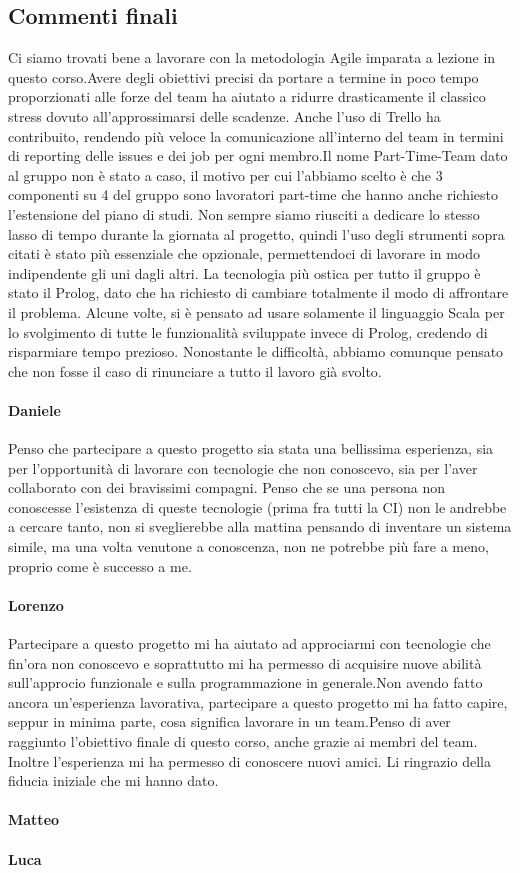 \subsection{Commenti finali}
Ci siamo trovati bene a lavorare con la metodologia Agile imparata a lezione in questo corso.Avere degli obiettivi precisi da portare a termine in poco tempo proporzionati alle forze del team ha aiutato a ridurre drasticamente il classico stress dovuto all’approssimarsi delle scadenze. \newline \newline Anche l’uso di Trello ha contribuito, rendendo più veloce la comunicazione all’interno del team in termini di reporting delle issues e dei job per ogni membro.\newline \newline Il nome Part-Time-Team dato al gruppo non è stato a caso, il motivo per cui l’abbiamo scelto è che 3 componenti su 4 del gruppo sono lavoratori part-time che hanno anche richiesto l’estensione del piano di studi. Non sempre siamo riusciti a dedicare lo stesso lasso di tempo durante la giornata al progetto, quindi l’uso degli strumenti sopra citati è stato più essenziale che opzionale, permettendoci di lavorare in modo indipendente gli uni dagli altri. \newline \newline La tecnologia più ostica per tutto il gruppo è stato il Prolog, dato che ha richiesto di cambiare totalmente il modo di affrontare il problema. Alcune volte, si è pensato ad usare solamente il linguaggio Scala per lo svolgimento di tutte le funzionalità sviluppate invece di Prolog, credendo di risparmiare tempo prezioso. Nonostante le difficoltà, abbiamo comunque pensato che non fosse il caso di rinunciare a tutto il lavoro già svolto.
\paragraph{Daniele}
Penso che partecipare a questo progetto sia stata una bellissima esperienza, sia per l’opportunità di lavorare con tecnologie che non conoscevo, sia per l’aver collaborato con dei bravissimi compagni. Penso che se una persona non conoscesse l’esistenza di queste tecnologie (prima fra tutti la CI) non le andrebbe a cercare tanto, non si sveglierebbe alla mattina pensando di inventare un sistema simile, ma una volta venutone a conoscenza, non ne potrebbe più fare a meno, proprio come è successo a me.
\paragraph{Lorenzo}
Partecipare a questo progetto mi ha aiutato ad approciarmi con tecnologie che fin'ora non conoscevo e soprattutto mi ha permesso di acquisire nuove abilità sull'approcio funzionale e sulla programmazione in generale.Non avendo fatto ancora un'esperienza lavorativa, partecipare a questo progetto mi ha fatto capire, seppur in minima parte, cosa significa lavorare in un team.\newline Penso di aver raggiunto l'obiettivo finale di questo corso, anche grazie ai membri del team. Inoltre l'esperienza mi ha permesso di conoscere nuovi amici. Li ringrazio della fiducia iniziale che mi hanno dato.
\paragraph{Matteo}
\paragraph{Luca}